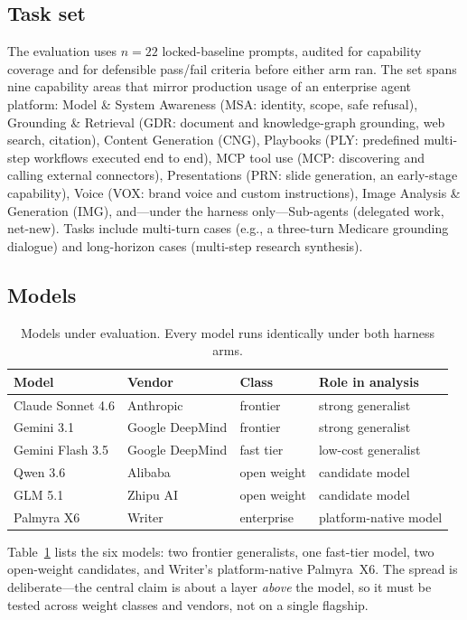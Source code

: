 \documentclass[11pt]{article}
\newcommand{\NP}{22}                    %
\newcommand{\NM}{six}                   %
\begin{document}
\subsection{Task set}

The evaluation uses $n=\NP{}$ locked-baseline prompts, audited for capability coverage and for defensible pass/fail criteria before either arm ran. The set spans nine capability areas that mirror production usage of an enterprise agent platform: Model \& System Awareness (MSA: identity, scope, safe refusal), Grounding \& Retrieval (GDR: document and knowledge-graph grounding, web search, citation), Content Generation (CNG), Playbooks (PLY: predefined multi-step workflows executed end to end), MCP tool use (MCP: discovering and calling external connectors), Presentations (PRN: slide generation, an early-stage capability), Voice (VOX: brand voice and custom instructions), Image Analysis \& Generation (IMG), and---under the harness only---Sub-agents (delegated work, net-new). Tasks include multi-turn cases (e.g., a three-turn Medicare grounding dialogue) and long-horizon cases (multi-step research synthesis).

\subsection{Models}

\begin{table}[t]
\centering\small
\caption{Models under evaluation. Every model runs identically under both harness arms.}
\label{tab:models}
\begin{tabular}{@{}llll@{}}
\toprule
Model & Vendor & Class & Role in analysis \\
\midrule
Claude Sonnet 4.6 & Anthropic & frontier & strong generalist \\
Gemini 3.1 & Google DeepMind & frontier & strong generalist \\
Gemini Flash 3.5 & Google DeepMind & fast tier & low-cost generalist \\
Qwen 3.6 & Alibaba & open weight & candidate model \\
GLM 5.1 & Zhipu AI & open weight & candidate model \\
Palmyra X6 & Writer & enterprise & platform-native model \\
\bottomrule
\end{tabular}
\end{table}

Table~\ref{tab:models} lists the \NM{} models: two frontier generalists, one fast-tier model, two open-weight candidates, and Writer's platform-native Palmyra~X6. The spread is deliberate---the central claim is about a layer \emph{above} the model, so it must be tested across weight classes and vendors, not on a single flagship.
\end{document}
